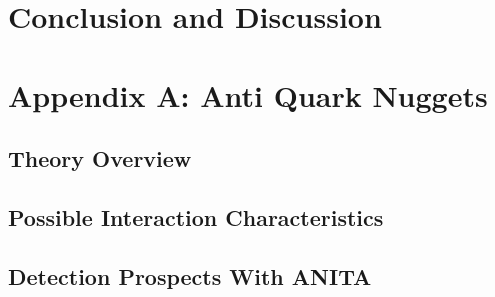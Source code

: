 \documentclass[11pt]{uhthesis}
\begin{document}
			
			
\chapter{Conclusion and Discussion}


\chapter{Appendix A: Anti Quark Nuggets}
\section{Theory Overview}

\section{Possible Interaction Characteristics}

\section{Detection Prospects With ANITA}
	
	
	
\end{document}
